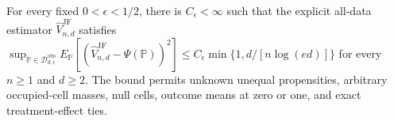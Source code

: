 For every fixed \(0<\epsilon<1/2\), there is \(C_\epsilon<\infty\) such that the explicit all-data estimator \(\widehat V_{n,d}^{\mathrm{JF}}\) satisfies \(\sup_{\mathbb P\in\mathcal D_{d,\epsilon}^{\mathrm{obs}}}E_{\mathbb P}[(\widehat V_{n,d}^{\mathrm{JF}}-\Psi(\mathbb P))^2]\leq C_\epsilon\min\{1,d/[n\log(ed)]\}\) for every \(n\geq1\) and \(d\geq2\).  The bound permits unknown unequal propensities, arbitrary occupied-cell masses, null cells, outcome means at zero or one, and exact treatment-effect ties.